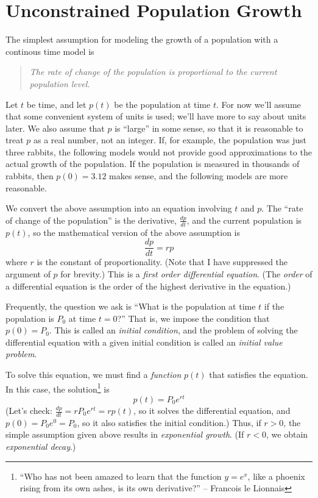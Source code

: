 \documentclass[reqno]{immbook}
\numberwithin{equation}{chapter}
\numberwithin{question}{section}
\numberwithin{theorem}{chapter}
\numberwithin{figure}{chapter}
\theoremstyle{definition}
\begin{document}
\section{Unconstrained Population Growth}
\label{sec:UnconstrPopGrowth}
% 
% 
The simplest assumption for modeling the growth of a population
with a continous time model is
\begin{quote}
\emph{The rate of change of the population is proportional to the current population level.}
\end{quote} 
Let $t$ be time, and let $p(t)$ be the population at time $t$.
For now we'll assume that some convenient system of units is used;
we'll have more to say about units later.
We also assume that $p$ is ``large'' in some sense, so that it is reasonable
to treat $p$ as a real number, not an integer.
If, for example, the population was just three rabbits, the following
models would not provide good
approximations to the actual growth of the population.
If the population is measured in thousands of rabbits,
then $p(0)=3.12$ makes sense,
and the following models are more reasonable.

We convert the above assumption into an equation involving $t$
and $p$.
The ``rate of change of the population'' is the derivative, $\frac{dp}{dt}$, and the
current population is $p(t)$, so the mathematical version of the above
assumption is
\begin{equation}
  \frac{dp}{dt} = rp
\label{eqn:growth}
\end{equation}
where $r$ is the constant of proportionality.
(Note that I have suppressed the argument of $p$ for brevity.)
This is a \emph{first order differential equation}.
(The \emph{order} of a differential equation is the order of the
highest derivative in the equation.)

Frequently, the question we ask is ``What is the population at time $t$
if the population is $P_0$ at time $t=0$?''  That is, we impose the
condition that $p(0)=P_0$.  This is called an
\emph{initial condition}, and the problem of solving the differential
equation with a given initial condition is called an
\emph{initial value problem}.

To solve this equation, we must find a \emph{function} $p(t)$
that satisfies the equation.  In this case, the solution\footnote{%
``Who has not been amazed to learn that the function $y = e^x$, like a 
      phoenix rising from its own ashes, is its own derivative?'' 
       -- Francois le Lionnais
}
is
\begin{equation}
  p(t) = P_0 e^{rt}
\end{equation}
(Let's check:  $\frac{dp}{dt} = rP_0e^{rt} = r p(t)$, so  it solves the differential
equation, and $p(0) = P_0e^0 = P_0$, so it also satisfies the initial condition.)
Thus, if $r > 0$, the simple assumption given above results in
\emph{exponential growth}.
(If $r < 0$, we obtain \emph{exponential decay}.)
\end{document}
